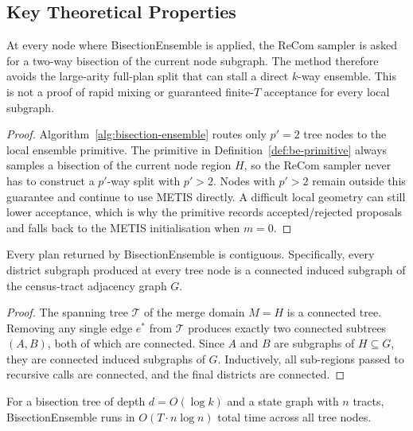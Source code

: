 \subsection{Key Theoretical Properties}
\label{sec:alg:theory}

\begin{proposition}
  \label{thm:tractable}
  At every node where BisectionEnsemble is applied, the ReCom sampler is asked
  for a two-way bisection of the current node subgraph.
  The method therefore avoids the large-arity full-plan split that can stall a
  direct $k$-way ensemble. This is not a proof of rapid mixing or guaranteed
  finite-$T$ acceptance for every local subgraph.
\end{proposition}

\begin{proof}
  Algorithm~\ref{alg:bisection-ensemble} routes only $p'=2$ tree nodes to the
  local ensemble primitive. The primitive in Definition~\ref{def:be-primitive}
  always samples a bisection of the current node region $H$, so the ReCom
  sampler never has to construct a $p'$-way split with $p'>2$.
  Nodes with $p'>2$ remain outside this guarantee and continue to use METIS
  directly. A difficult local geometry can still lower acceptance, which is why
  the primitive records accepted/rejected proposals and falls back to the METIS
  initialisation when $m=0$.
\end{proof}

\begin{proposition}
  \label{prop:contiguity}
  Every plan returned by BisectionEnsemble is contiguous. Specifically, every
  district subgraph produced at every tree node is a connected induced subgraph
  of the census-tract adjacency graph $G$.
\end{proposition}

\begin{proof}
  The spanning tree $\mathcal{T}$ of the merge domain $M = H$ is a connected tree.
  Removing any single edge $e^*$ from $\mathcal{T}$ produces exactly two
  connected subtrees $(A, B)$, both of which are connected. Since $A$ and $B$
  are subgraphs of $H \subseteq G$, they are connected induced subgraphs of $G$.
  Inductively, all sub-regions passed to recursive calls are connected, and the
  final districts are connected.
\end{proof}

\begin{proposition}[Complexity]
  \label{prop:complexity}
  For a bisection tree of depth $d = O(\log k)$ and a state graph with $n$ tracts,
  BisectionEnsemble runs in $O(T \cdot n \log n)$ total time across all tree nodes.
\end{proposition}

